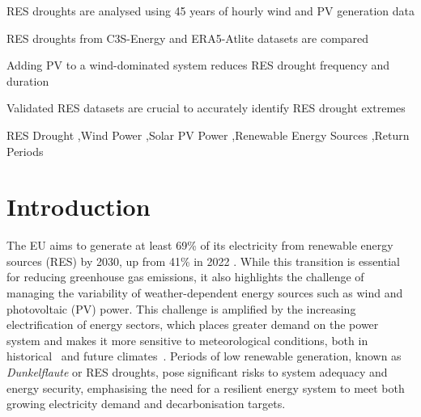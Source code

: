 \documentclass[preprint, 12pt]{elsarticle}
\begin{document}
\begin{frontmatter}
\begin{highlights}
\item RES droughts are analysed using 45 years of hourly wind and PV generation data

\item RES droughts from C3S-Energy and ERA5-Atlite datasets are compared

\item Adding PV to a wind-dominated system reduces RES drought frequency and duration

\item Validated RES datasets are crucial to accurately identify RES drought extremes

\end{highlights}

\begin{keyword}
RES Drought \sep Wind Power \sep Solar PV Power \sep Renewable Energy Sources \sep Return Periods

\end{keyword}

\end{frontmatter}

\linenumbers

\section{Introduction}
\label{sec:intro}

The EU aims to generate at least 69\% of its electricity from renewable energy sources (RES) by 2030, up from 41\% in 2022 \citep{eurostat2023share}. While this transition is essential for reducing greenhouse gas emissions, it also highlights the challenge of managing the variability of weather-dependent energy sources such as wind and photovoltaic (PV) power. This challenge is amplified by the increasing electrification of energy sectors, which places greater demand on the power system and makes it more sensitive to meteorological conditions, both in historical~\citep{bloomfield2016} and future climates~\citep{bloomfield2021}. Periods of low renewable generation, known as \textit{Dunkelflaute} or RES droughts, pose significant risks to system adequacy and energy security, emphasising the need for a resilient energy system to meet both growing electricity demand and decarbonisation targets.
\end{document}

